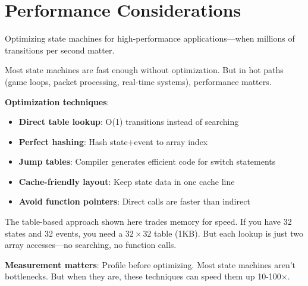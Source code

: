 \section{Performance Considerations}

Optimizing state machines for high-performance applications---when millions of transitions per second matter.

Most state machines are fast enough without optimization. But in hot paths (game loops, packet processing, real-time systems), performance matters.

\textbf{Optimization techniques}:
\begin{itemize}
    \item \textbf{Direct table lookup}: O(1) transitions instead of searching
    \item \textbf{Perfect hashing}: Hash state+event to array index
    \item \textbf{Jump tables}: Compiler generates efficient code for switch statements
    \item \textbf{Cache-friendly layout}: Keep state data in one cache line
    \item \textbf{Avoid function pointers}: Direct calls are faster than indirect
\end{itemize}

The table-based approach shown here trades memory for speed. If you have 32 states and 32 events, you need a $32\times32$ table (1KB). But each lookup is just two array accesses---no searching, no function calls.

\textbf{Measurement matters}: Profile before optimizing. Most state machines aren't bottlenecks. But when they are, these techniques can speed them up 10-100$\times$.

